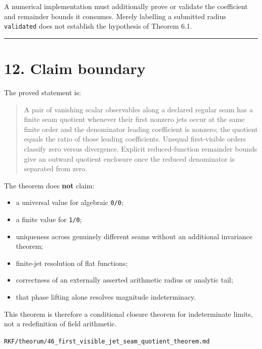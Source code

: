 A numerical implementation must additionally prove or validate the coefficient
and remainder bounds it consumes. Merely labelling a submitted radius
\texttt{validated} does not establish the hypothesis of Theorem 6.1.

\begin{center}\rule{0.5\linewidth}{0.5pt}\end{center}

\hypertarget{claim-boundary}{%
\section{12. Claim boundary}\label{claim-boundary}}

The proved statement is:

\begin{quote}
A pair of vanishing scalar observables along a declared regular seam has a
finite seam quotient whenever their first nonzero jets occur at the same
finite order and the denominator leading coefficient is nonzero; the quotient
equals the ratio of those leading coefficients. Unequal first-visible orders
classify zero versus divergence. Explicit reduced-function remainder bounds
give an outward quotient enclosure once the reduced denominator is separated
from zero.
\end{quote}

The theorem does \textbf{not} claim:

\begin{itemize}
\tightlist
\item
  a universal value for algebraic \texttt{0/0};
\item
  a finite value for \texttt{1/0};
\item
  uniqueness across genuinely different seams without an additional invariance theorem;
\item
  finite-jet resolution of flat functions;
\item
  correctness of an externally asserted arithmetic radius or analytic tail;
\item
  that phase lifting alone resolves magnitude indeterminacy.
\end{itemize}

This theorem is therefore a conditional closure theorem for indeterminate
limits, not a redefinition of field arithmetic.

\begin{flushright}\small\texttt{RKF/theorum/46\_first\_visible\_jet\_seam\_quotient\_theorem.md}\end{flushright}
